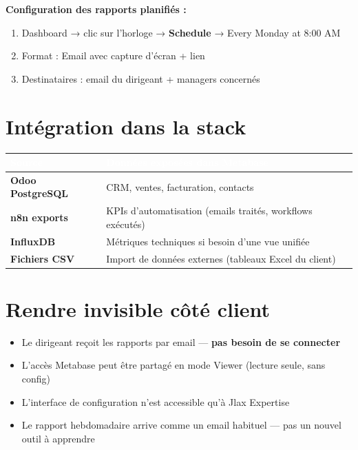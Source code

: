 \documentclass[11pt, a4paper]{article}
\begin{document}
\textbf{Configuration des rapports planifiés :}
\begin{enumerate}
  \item Dashboard → clic sur l'horloge → \textbf{Schedule} → Every Monday at 8:00 AM
  \item Format : Email avec capture d'écran + lien
  \item Destinataires : email du dirigeant + managers concernés
\end{enumerate}

\section{Intégration dans la stack}

\begin{center}
\renewcommand{\arraystretch}{1.4}
\begin{tabularx}{\linewidth}{>{\bfseries}p{2.8cm} X}
\toprule
\rowcolor{tabheader}
\textcolor{white}{\textbf{Source}} & \textcolor{white}{\textbf{Données exposées dans Metabase}} \\
\midrule
Odoo PostgreSQL & CRM, ventes, facturation, contacts \\
\rowcolor{rowgray}
n8n exports & KPIs d'automatisation (emails traités, workflows exécutés) \\
InfluxDB & Métriques techniques si besoin d'une vue unifiée \\
\rowcolor{rowgray}
Fichiers CSV & Import de données externes (tableaux Excel du client) \\
\bottomrule
\end{tabularx}
\end{center}

\section{Rendre invisible côté client}

\begin{itemize}
  \item Le dirigeant reçoit les rapports par email — \textbf{pas besoin de se connecter}
  \item L'accès Metabase peut être partagé en mode Viewer (lecture seule, sans config)
  \item L'interface de configuration n'est accessible qu'à Jlax Expertise
  \item Le rapport hebdomadaire arrive comme un email habituel — pas un nouvel outil à apprendre
\end{itemize}
\end{document}
